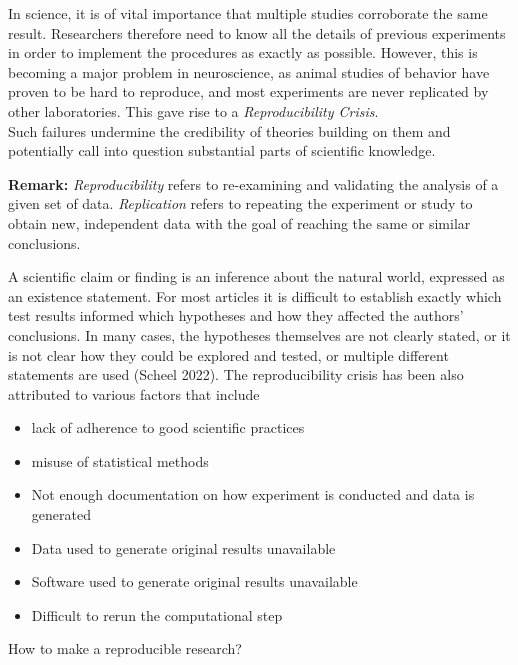 \documentclass[
]{article}
\providecommand{\tightlist}{%
  \setlength{\itemsep}{0pt}\setlength{\parskip}{0pt}}
\begin{document}
In science, it is of vital importance that multiple studies corroborate
the same result. Researchers therefore need to know all the details of
previous experiments in order to implement the procedures as exactly as
possible. However, this is becoming a major problem in neuroscience, as
animal studies of behavior have proven to be hard to reproduce, and most
experiments are never replicated by other laboratories. This gave rise
to a \emph{Reproducibility Crisis}.\\
Such failures undermine the credibility of theories building on them and
potentially call into question substantial parts of scientific
knowledge.

\textbf{Remark:} \emph{Reproducibility} refers to re-examining and
validating the analysis of a given set of data. \emph{Replication}
refers to repeating the experiment or study to obtain new, independent
data with the goal of reaching the same or similar conclusions.

A scientific claim or finding is an inference about the natural world,
expressed as an existence statement. For most articles it is difficult
to establish exactly which test results informed which hypotheses and
how they affected the authors' conclusions. In many cases, the
hypotheses themselves are not clearly stated, or it is not clear how
they could be explored and tested, or multiple different statements are
used (Scheel 2022). The reproducibility crisis has been also attributed
to various factors that include

\begin{itemize}
\tightlist
\item
  lack of adherence to good scientific practices
\item
  misuse of statistical methods
\item
  Not enough documentation on how experiment is conducted and data is
  generated
\item
  Data used to generate original results unavailable
\item
  Software used to generate original results unavailable
\item
  Difficult to rerun the computational step
\end{itemize}

How to make a reproducible research?
\end{document}

